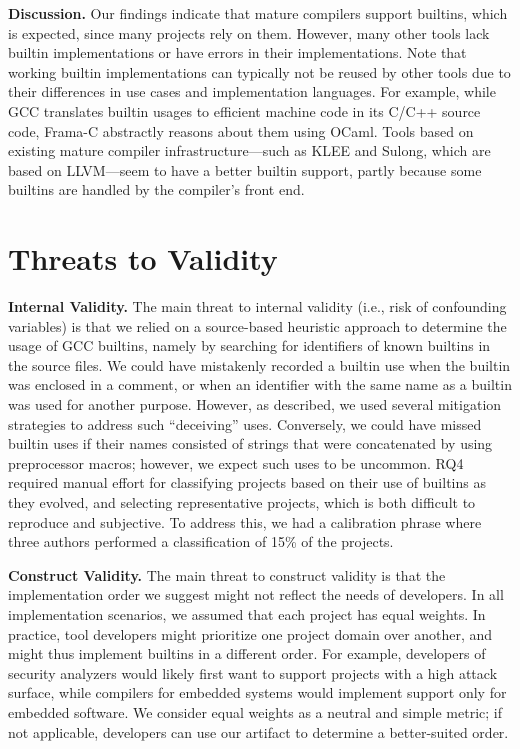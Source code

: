 \documentclass[sigconf,screen]{acmart}
\renewcommand{\paragraph}[1]{\textbf{#1}}
\begin{document}
\paragraph{Discussion.}
Our findings indicate that mature compilers support builtins, which is expected, since many projects rely on them.
However, many other tools lack builtin implementations or have errors in their implementations.
Note that working builtin implementations can typically not be reused by other tools due to their differences in use cases and implementation languages.
For example, while GCC translates builtin usages to efficient machine code in its C/C++ source code, Frama-C abstractly reasons about them using OCaml.
Tools based on existing mature compiler infrastructure---such as KLEE and Sulong, which are based on LLVM---seem to have a better builtin support, partly because some builtins are handled by the compiler's front end.

\section{Threats to Validity}

\paragraph{Internal Validity.}
The main threat to internal validity (i.e., risk of confounding variables) is that we relied on a source-based heuristic approach to determine the usage of GCC builtins, namely by searching for identifiers of known builtins in the source files.
We could have mistakenly recorded a builtin use when the builtin was enclosed in a comment, or when an identifier with the same name as a builtin was used for another purpose.
However, as described, we used several mitigation strategies to address such ``deceiving'' uses.
Conversely, we could have missed builtin uses if their names consisted of strings that were concatenated by using preprocessor macros; however, we expect such uses to be uncommon.
RQ4 required manual effort for classifying projects based on their use of builtins as they evolved, and selecting representative projects, which is both difficult to reproduce and subjective.
To address this, we had a calibration phrase where three authors performed a classification of 15\% of the projects.

\paragraph{Construct Validity.}
The main threat to construct validity is that the implementation order we suggest might not reflect the needs of developers.
In all implementation scenarios, we assumed that each project has equal weights.
In practice, tool developers might prioritize one project domain over another, and might thus implement builtins in a different order.
For example, developers of security analyzers would likely first want to support projects with a high attack surface, while compilers for embedded systems would implement support only for embedded software.
We consider equal weights as a neutral and simple metric; if not applicable, developers can use our artifact to determine a better-suited order.
\end{document}
